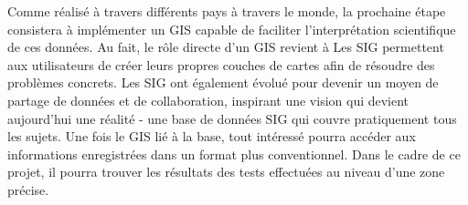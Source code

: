 \par
Comme réalisé à travers différents pays à travers le monde, la prochaine 
étape consistera à implémenter un GIS capable de faciliter l'interprétation 
scientifique de ces données. Au fait, le rôle directe d'un GIS revient à 
Les SIG permettent aux utilisateurs de créer leurs propres couches de cartes 
afin de résoudre des problèmes concrets. Les SIG ont également évolué pour 
devenir un moyen de partage de données et de collaboration, inspirant une 
vision qui devient aujourd’hui une réalité - une base de données SIG qui 
couvre pratiquement tous les sujets. 
Une fois le GIS lié à la base, tout intéressé pourra accéder aux informations 
enregistrées dans un format plus conventionnel. Dans le cadre de ce projet, il 
pourra trouver les résultats des tests effectuées au niveau d'une zone précise.